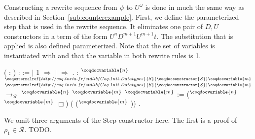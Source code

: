 Constructing a rewrite sequence from $\psi$ to $U^\omega$ is done in
much the same way as described in
Section~\ref{sub:counterexample}. First, we define the parameterized
step that is used in the rewrite sequence. It eliminates one pair of $D,
U$ constructors in a term of the form $U^n D^{m+1} U^{m+1} t$. The
substitution that is applied is also defined parameterized. Note that
the set of variables  is instantiated with
and that the variable in both rewrite rules is 1.
\begin{singlespace}
\begin{coqdoccode}
\coqdocnoindent
{}
\coqdocdefinition{$\sigma$}
 ( :
) :
 :=\coqdoceol
\coqdocindent{1.00em}
  \coqdoceol
\coqdocindent{1.00em}
\ensuremath{|} 1 \ensuremath{\Rightarrow}
\coqdoceol
\coqdocindent{1.00em}
\ensuremath{|} \coqdocvar{\_} \ensuremath{\Rightarrow}
\coqdoceol
\coqdocindent{1.00em}
.\coqdoceol
\coqdocemptyline
\coqdocnoindent
{}
\coqdocdefinition{$\pi$}
   :
$^\coqdocvariable{n}$
$^{\coqexternalref{http://coq.inria.fr/stdlib/Coq.Init.Datatypes}{S}{\coqdocconstructor{S}} \coqdocvariable{m}}$
$^{\coqexternalref{http://coq.inria.fr/stdlib/Coq.Init.Datatypes}{S}{\coqdocconstructor{S}}
\coqdocvariable{m}}$
 $\rightarrow_\mathcal{R}$
$^\coqdocvariable{n}$
$^\coqdocvariable{m}$
$^\coqdocvariable{m}$
 :=\coqdoceol
\coqdocindent{2.00em}
($^\coqdocvariable{n}$
$^\coqdocvariable{m}$ $\Box$)
(\coqdocdefinition{$\sigma$}
($^\coqdocvariable{m}$ ))
\coqdoclemma{\_}
\coqdoclemma{\_}
\coqdoclemma{\_}.\coqdoceol
\end{coqdoccode}
\end{singlespace}
We omit three arguments of the Step constructor here. The first
is a proof of $\rho_1 \in \mathcal{R}$. TODO.
